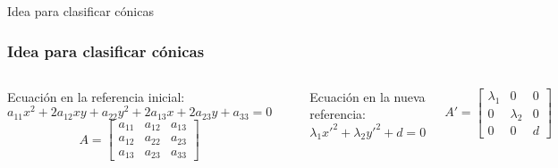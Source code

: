 \documentclass[xcolor={dvipsnames},aspectratio=169,10pt]{beamer}
\begin{document}
\begin{frame}{Idea para clasificar cónicas}
  \frametitle{Idea para clasificar cónicas}
  
  \begin{columns}
    Ecuación en la referencia inicial:
    \begin{equation*}
      a_{11}x^2 + 2a_{12}xy + a_{22}y^2 + 2a_{13}x + 2a_{23}y + a_{33} = 0
    \end{equation*}
    \begin{equation*}
      A = \begin{bmatrix}
        a_{11} & a_{12} & a_{13} \\
        a_{12} & a_{22} & a_{23} \\
        a_{13} & a_{23} & a_{33}
      \end{bmatrix}
    \end{equation*}

    \begin{center}
    \end{center}

    Ecuación en la nueva referencia:
    \begin{equation*}
      \lambda_1x'^2 + \lambda_2y'^2 + d= 0
    \end{equation*}

    \begin{equation*}
      A' = \begin{bmatrix}
        \lambda_1 & 0 & 0 \\
        0 & \lambda_2 & 0 \\
        0 & 0 & d
      \end{bmatrix}
    \end{equation*}
  \end{columns}
\end{frame}
\end{document}
